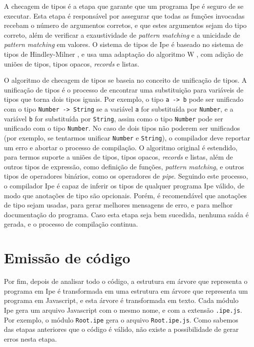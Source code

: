 A checagem de tipos é a etapa que garante que um programa Ipe é seguro de se executar. Esta etapa é
responsável por assegurar que todas as funções invocadas recebam o número de argumentos corretos, e
que estes argumentos sejam do tipo correto, além de verificar a exaustividade de \textit{pattern matching}
e a unicidade de \textit{pattern matching} em valores. O sistema de tipos de Ipe é baseado no sistema
de tipos de Hindley-Milner \cite{principaltypeschemes}, e usa uma adaptação do algoritmo W \cite{understaingalgorithmw},
com adição de uniões de tipos, tipos opacos, \textit{records} e listas.

O algoritmo de checagem de tipos se baseia no conceito de unificação de tipos. A unificação de tipos
é o processo de encontrar uma substituição para variáveis de tipos que torna dois tipos iguais. Por
exemplo, o tipo \texttt{a -> b} pode ser unificado com o tipo \texttt{Number -> String} se a variável
\texttt{a} for substituída por \texttt{Number}, e a variável \texttt{b} for substituída por
\texttt{String}, assim como o tipo \texttt{Number} pode ser unificado com o tipo \texttt{Number}.
No caso de dois tipos não poderem ser unificados (por exemplo, se tentarmos unificar \texttt{Number}
e \texttt{String}), o compilador deve reportar um erro e abortar o processo de compilação. O algoritmo
original é estendido, para termos suporte a uniões de tipos, tipos opacos, \textit{records} e listas,
além de outros tipos de expressão, como definição de funções, \textit{pattern matching}, e outros
tipos de operadores binários, como os operadores de \textit{pipe}. Seguindo este processo, o
compilador Ipe é capaz de inferir os tipos de qualquer programa Ipe válido, de modo que anotações de
tipo são opcionais. Porém, é recomendável que anotações de tipo sejam usadas, para gerar melhores
mensagens de erro, e para melhor documentação do programa. Caso esta etapa seja bem sucedida, nenhuma
saída é gerada, e o processo de compilação continua.


\section{Emissão de código}

Por fim, depois de analisar todo o código, a estrutura em árvore que representa o programa em Ipe é
transformada em uma estrutura em árvore que representa um programa em Javascript, e esta árvore é
transformada em texto. Cada módulo Ipe gera um arquivo Javascript com o mesmo nome, e com a extensão
\texttt{.ipe.js}. Por exemplo, o módulo \texttt{Root.ipe} gera o arquivo \texttt{Root.ipe.js}. Como
sabemos das etapas anteriores que o código é válido, não existe a possibilidade de gerar erros nesta
etapa.

